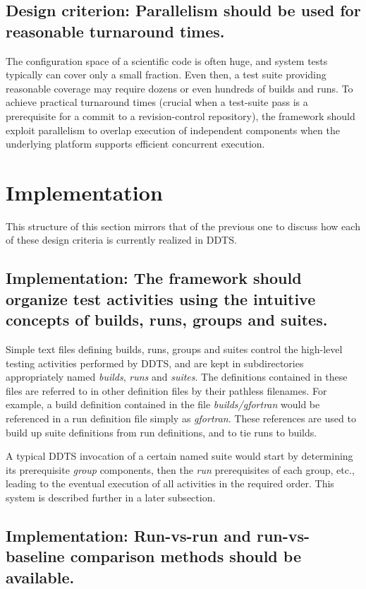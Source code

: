 \documentclass[conference]{IEEEtran}
\begin{document}
\subsection{Design criterion: Parallelism should be used for reasonable turnaround times.}

The configuration space of a scientific code is often huge, and system tests typically can cover only a small fraction. Even then, a test suite providing reasonable coverage may require dozens or even hundreds of builds and runs. To achieve practical turnaround times (crucial when a test-suite pass is a prerequisite for a commit to a revision-control repository), the framework should exploit parallelism to overlap execution of independent components when the underlying platform supports efficient concurrent execution.

\section{Implementation}

This structure of this section mirrors that of the previous one to discuss how each of these design criteria is currently realized in DDTS.

\subsection{Implementation: The framework should organize test activities using the intuitive concepts of builds, runs, groups and suites.}

Simple text files defining builds, runs, groups and suites control the high-level testing activities performed by DDTS, and are kept in subdirectories appropriately named \emph{builds}, \emph{runs} and \emph{suites}. The definitions contained in these files are referred to in other definition files by their pathless filenames. For example, a build definition contained in the file \emph{builds/gfortran} would be referenced in a run definition file simply as \emph{gfortran}. These references are used to build up suite definitions from run definitions, and to tie runs to builds.

A typical DDTS invocation of a certain named suite would start by determining its prerequisite \emph{group} components, then the \emph{run} prerequisites of each group, etc., leading to the eventual execution of all activities in the required order. This system is described further in a later subsection.

\subsection{Implementation: Run-vs-run and run-vs-baseline comparison methods should be available.}
\end{document}
